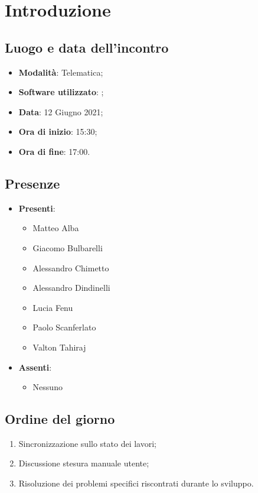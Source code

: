 \documentclass[]{article}
\begin{document}
	

	\newpage


		\section{Introduzione}
		\subsection{Luogo e data dell'incontro}
		\begin{itemize}
			\item \textbf{Modalità}: Telematica;
			\item \textbf{Software utilizzato}: ;
			\item \textbf{Data}: 12 Giugno 2021;
			\item \textbf{Ora di inizio}: 15:30;
			\item \textbf{Ora di fine}: 17:00.
		\end{itemize}

		\subsection{Presenze}
		\begin{itemize}
			\item \textbf{Presenti}:
			\begin{itemize}
				\item Matteo Alba
				\item Giacomo Bulbarelli
				\item Alessandro Chimetto
				\item Alessandro Dindinelli
				\item Lucia Fenu
				\item Paolo Scanferlato
				\item Valton Tahiraj
			\end{itemize}
			\item \textbf{Assenti}:
			\begin{itemize}
				\item Nessuno
			\end{itemize}
		\end{itemize}


		\subsection{Ordine del giorno}
		\begin{enumerate}
			\item Sincronizzazione sullo stato dei lavori;
			\item Discussione stesura manuale utente;
			\item Risoluzione dei problemi specifici riscontrati durante lo sviluppo.
		\end{enumerate}
\end{document}
